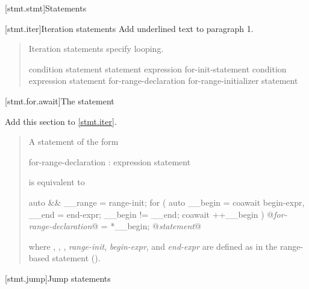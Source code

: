 
[stmt.stmt]{Statements}%

\setcounter{section}{4}
[stmt.iter]{Iteration statements}%
Add underlined text to paragraph 1.

\begin{quote}
\pnum
Iteration statements specify looping.

%
%
%
%
\begin{bnf}
	\br
	 condition \terminal{)} statement\br
	 statement  expression \terminal{) ;}\br
	 for-init-statement condition\opt \terminal{;} expression\opt \terminal{)} statement\br
	 for-range-declaration \terminal{:} for-range-initializer \terminal{)} statement\br
\end{bnf}
\end{quote}


\setcounter{subsection}{4}
[stmt.for.await]{The  statement}%

Add this section to \ref{stmt.iter}.


\begin{quote}
\pnum
A  statement of the form

\begin{ncbnf}
	 for-range-declaration : expression \terminal{)} statement
\end{ncbnf}
is equivalent to

\begin{codeblock}
	{
		auto && __range = range-init;
		for ( auto __begin = coawait begin-expr,
		__end = end-expr;
		__begin != __end;
		coawait ++__begin ) {
			@\textit{for-range-declaration}@ = *__begin;
			@\textit{statement}@
		}
	}
\end{codeblock}

where , , , 
\textit{range-init}, \textit{begin-expr}, and \textit{end-expr} are defined as in the range-based  statement ().

\end{quote}

\setcounter{section}{5}
[stmt.jump]{Jump statements}%

